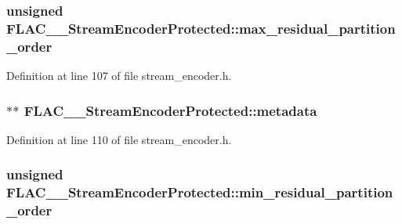 \subsubsection[{\texorpdfstring{max\+\_\+residual\+\_\+partition\+\_\+order}{max_residual_partition_order}}]{\setlength{\rightskip}{0pt plus 5cm}unsigned F\+L\+A\+C\+\_\+\+\_\+\+Stream\+Encoder\+Protected\+::max\+\_\+residual\+\_\+partition\+\_\+order}\hypertarget{struct_f_l_a_c_____stream_encoder_protected_ae9a433e562e96d008c8ecc9779ea8289}{}\label{struct_f_l_a_c_____stream_encoder_protected_ae9a433e562e96d008c8ecc9779ea8289}


Definition at line 107 of file stream\+\_\+encoder.\+h.

\subsubsection[{\texorpdfstring{metadata}{metadata}}]{$\ast$$\ast$ F\+L\+A\+C\+\_\+\+\_\+\+Stream\+Encoder\+Protected\+::metadata}\hypertarget{struct_f_l_a_c_____stream_encoder_protected_ad296447a20c5d7aeda4de51b845d12ee}{}\label{struct_f_l_a_c_____stream_encoder_protected_ad296447a20c5d7aeda4de51b845d12ee}


Definition at line 110 of file stream\+\_\+encoder.\+h.

\subsubsection[{\texorpdfstring{min\+\_\+residual\+\_\+partition\+\_\+order}{min_residual_partition_order}}]{\setlength{\rightskip}{0pt plus 5cm}unsigned F\+L\+A\+C\+\_\+\+\_\+\+Stream\+Encoder\+Protected\+::min\+\_\+residual\+\_\+partition\+\_\+order}\hypertarget{struct_f_l_a_c_____stream_encoder_protected_af50dd0ed78f5580bff0c60c199ae9039}{}\label{struct_f_l_a_c_____stream_encoder_protected_af50dd0ed78f5580bff0c60c199ae9039}


